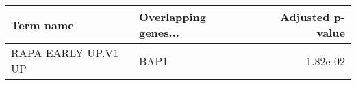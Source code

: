 \begin{tabular}{llr}
\toprule
          Term name & Overlapping genes... &  Adjusted p-value \\
\midrule
RAPA EARLY UP.V1 UP &                 BAP1 &          1.82e-02 \\
\bottomrule
\end{tabular}
